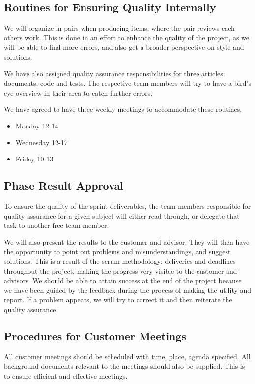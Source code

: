 \subsection{Routines for Ensuring Quality Internally}
We will organize in pairs when producing items, where the pair reviews each others work. This is done in an effort to enhance the quality of the project, as we will be able to find more errors, and 
also get a broader perspective on style and solutions.

We have also assigned quality assurance responsibilities for three articles: documents, code and tests. The respective team members will try to have a bird's eye overview in their area to catch further errors.

We have agreed to have three weekly meetings to accommodate these routines.
\begin{itemize}
	\item Monday 12-14
	\item Wednesday 12-17
	\item Friday 10-13
\end{itemize}

\subsection{Phase Result Approval}
To ensure the quality of the sprint deliverables, the team members responsible for quality assurance for a given subject will either read through, or delegate that task to another free team member.

We will also present the results to the customer and advisor. They will then have the opportunity to point out problems and misunderstandings, and suggest solutions. This is a result of the \Gls{scrum} methodology: deliveries and deadlines throughout the project, making the progress very visible to the customer and advisors. We should be able to attain success at the end of the project because we have been guided by the feedback during the process of making the utility and report. If a problem appears, we will try to correct it and then reiterate the quality assurance.

\subsection{Procedures for Customer Meetings}
All customer meetings should be scheduled with time, place, agenda specified. All background documents relevant to the meetings should also be supplied. This is to ensure efficient and effective meetings.

